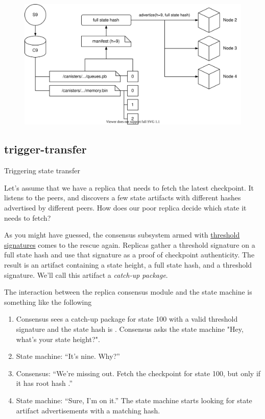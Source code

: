 \documentclass{article}
\begin{document}
\begin{figure}[grayscale-diagram]
\includegraphics{images/02-checkpoint-artifact.svg}
\end{figure}

\subsection{trigger-transfer}{Triggering state transfer}

Let's assume that we have a replica that needs to fetch the latest checkpoint.
It listens to the peers, and discovers a few state artifacts with different hashes advertised by different peers.
How does our poor replica decide which state it needs to fetch?

As you might have guessed, the consensus subsystem armed with \href{https://en.wikipedia.org/wiki/Threshold_cryptosystem}{threshold signatures} comes to the rescue again.
Replicas gather a threshold signature on a full state hash and use that signature as a proof of checkpoint authenticity.
The result is an artifact containing a state height, a full state hash, and a threshold signature.
We'll call this artifact a \emph{catch-up package}.

The interaction between the replica consensus module and the state machine is something like the following
\begin{enumerate}
\item 
  Consensus sees a catch-up package for state 100 with a valid threshold signature and the state hash is .
  Consensus asks the state machine "Hey, what's your state height?".
\item State machine: ``It's nine. Why?''
\item Consensus: ``We're missing out. Fetch the checkpoint for state 100, but only if it has root hash .''
\item State machine: ``Sure, I'm on it.'' The state machine starts looking for state artifact advertisements with a matching hash.
\end{enumerate}
\end{document}

